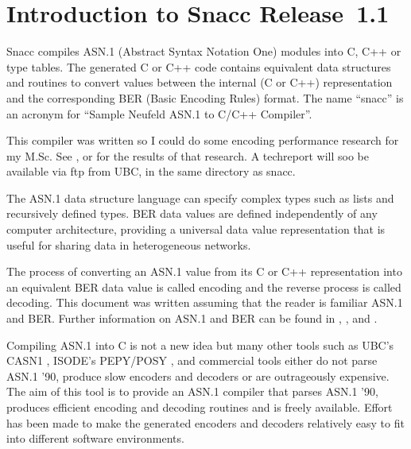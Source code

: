 
%
%

\chapter{\label{intro-1.1}Introduction to Snacc Release~1.1}

Snacc compiles ASN.1 \cite{X.208} (Abstract Syntax Notation One)
modules into C, C++ or type tables.  The generated C or C++ code
contains equivalent data structures and routines to convert values
between the internal (C or C++) representation and the corresponding
BER \cite{X.209} (Basic Encoding Rules) format.  The name ``snacc'' is
an acronym for ``Sample Neufeld ASN.1 to C/C++ Compiler''.

This compiler was written so I could do some encoding performance
research for my M.Sc.  See \cite{Sample93-1}, or \cite{Sample93-2} for
the results of that research.  A techreport will soo be available
via ftp from UBC, in the same directory as snacc.

The ASN.1 data structure language can specify complex types such as
lists and recursively defined types. BER data values are defined
independently of any computer architecture, providing a universal data
value representation that is useful for sharing data in heterogeneous
networks.

The process of converting an ASN.1 value from its C or C++
representation into an equivalent BER data value is called encoding
and the reverse process is called decoding.  This document was written
assuming that the reader is familiar ASN.1 and BER.  Further
information on ASN.1 and BER can be found in \cite{ASN.1Book},
\cite{ASN.1Overview}, \cite{X.208} and \cite{X.209}.

Compiling ASN.1 into C is not a new idea but many other tools such as
UBC's CASN1 \cite{CASN1}, ISODE's PEPY/POSY \cite{ISODE}, and
commercial tools either do not parse ASN.1 '90, produce slow encoders
and decoders or are outrageously expensive. The aim of this tool is to
provide an ASN.1 compiler that parses ASN.1 '90, produces efficient
encoding and decoding routines and is freely available.  Effort has
been made to make the generated encoders and decoders relatively easy
to fit into different software environments.

